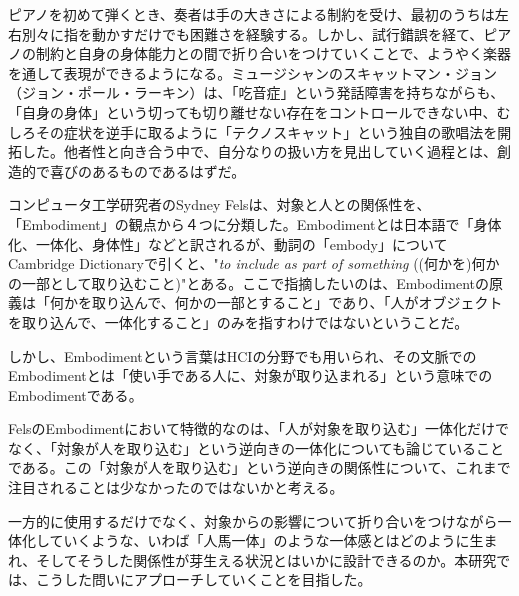 ピアノを初めて弾くとき、奏者は手の大きさによる制約を受け、最初のうちは左右別々に指を動かすだけでも困難さを経験する。しかし、試行錯誤を経て、ピアノの制約と自身の身体能力との間で折り合いをつけていくことで、ようやく楽器を通して表現ができるようになる。ミュージシャンのスキャットマン・ジョン（ジョン・ポール・ラーキン）は、「吃音症」という発話障害を持ちながらも、「自身の身体」という切っても切り離せない存在をコントロールできない中、むしろその症状を逆手に取るように「テクノスキャット」という独自の歌唱法を開拓した。他者性と向き合う中で、自分なりの扱い方を見出していく過程とは、創造的で喜びのあるものであるはずだ。

コンピュータ工学研究者のSydney Felsは、対象と人との関係性を、「Embodiment」の観点から４つに分類した\cite{Fels}。Embodimentとは日本語で「身体化、一体化、身体性」などと訳されるが、動詞の「embody」についてCambridge Dictionaryで引くと、"\textit{to include as part of something} ((何かを)何かの一部として取り込むこと)"とある\cite{embody}。ここで指摘したいのは、Embodimentの原義は「何かを取り込んで、何かの一部とすること」であり、「人がオブジェクトを取り込んで、一体化すること」のみを指すわけではないということだ。

しかし、Embodimentという言葉はHCIの分野でも用いられ、その文脈でのEmbodimentとは「使い手である人に、対象が取り込まれる」という意味でのEmbodimentである\cite{veq}。

FelsのEmbodimentにおいて特徴的なのは、「人が対象を取り込む」一体化だけでなく、「対象が人を取り込む」という逆向きの一体化についても論じていることである。この「対象が人を取り込む」という逆向きの関係性について、これまで注目されることは少なかったのではないかと考える。

一方的に使用するだけでなく、対象からの影響について折り合いをつけながら一体化していくような、いわば「人馬一体」のような一体感とはどのように生まれ、そしてそうした関係性が芽生える状況とはいかに設計できるのか。本研究では、こうした問いにアプローチしていくことを目指した。




